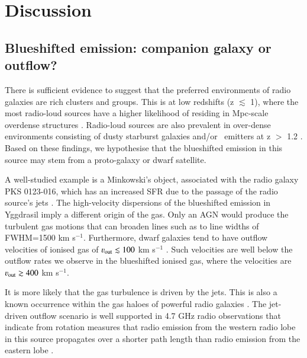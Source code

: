 
\section{Discussion}\label{section:discussion}
\subsection{Blueshifted emission: companion galaxy or outflow?}\label{discussion:blueshifted-emission}

There is sufficient evidence to suggest that the preferred environments of radio galaxies are rich clusters and groups. This is at low redshifts (z $\lesssim$ 1), where the most radio-loud sources have a higher likelihood of residing in Mpc-scale overdense structures \citep[e.g.][]{best2007,karouzos2014a,magliocchetti2018,kolwa2019a}. Radio-loud sources are also prevalent in over-dense environments consisting of dusty starburst galaxies and/or \lya~emitters at z $>$ 1.2 \citep[e.g.][]{hatch2011,wylezalek2013,dannerbauer2014,saito2015}. Based on these findings, we hypothesise that the blueshifted emission in this source may stem from a proto-galaxy or dwarf satellite.

A well-studied example is a Minkowski's object, associated with the radio galaxy PKS 0123-016, which has an increased SFR due to the passage of the radio source's jets \citep{vanbreugel1985}. The high-velocity dispersions of the blueshifted emission in Yggdrasil imply a different origin of the gas. Only an AGN would produce the turbulent gas motions that can broaden lines such as  to line widths of FWHM=1500 km s$^{-1}.$ Furthermore, dwarf galaxies tend to have outflow velocities of ionised gas of $\varv_{\rm out} \lesssim 100$ km s$^{-1}$ \citep{martin2005}. Such velocities are well below the outflow rates we observe in the blueshifted ionised gas, where the velocities are $\varv_{\rm out} \gtrsim 400$ km s$^{-1}$. 

It is more likely that the gas turbulence is driven by the jets. This is also a known occurrence within the gas haloes of powerful radio galaxies \citep[e.g.][]{humphrey2006,morais2017,nesvadba2017a}. The jet-driven outflow scenario is well supported in 4.7 GHz radio observations that indicate from rotation measures that radio emission from the western radio lobe in this source propagates over a shorter path length than radio emission from the eastern lobe \citep[e.g.][]{carilli1997}. 


